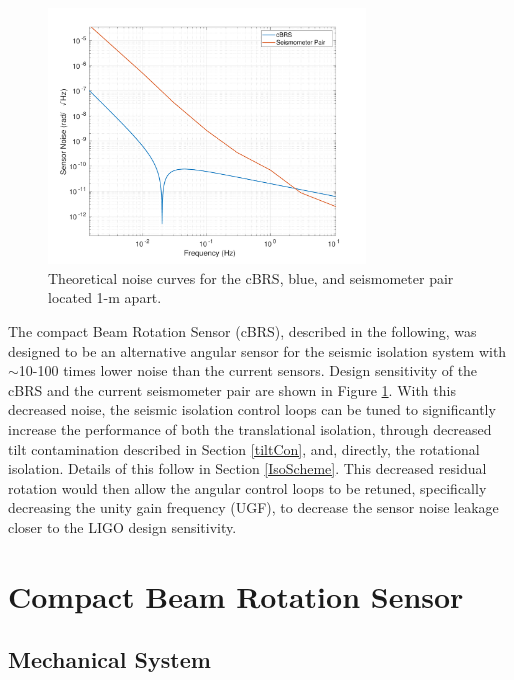 \documentclass [12pt, proquest]{uwthesis}[2019]
\begin{document}
\begin{figure}[!h]
\begin{center}
\includegraphics[width=0.75\textwidth]{sensorNoise.pdf}
\caption[Theoretical noise curves for the cBRS and seismometer pair]{Theoretical noise curves for the cBRS, blue, and seismometer pair located 1-m apart.}
\label{sensNoise}
\end{center}
\end{figure}


The compact Beam Rotation Sensor (cBRS), described in the following, was designed to be an alternative angular sensor for the seismic isolation system with $\sim$10-100 times lower noise than the current sensors. Design sensitivity of the cBRS and the current seismometer pair are shown in Figure \ref{sensNoise}. With this decreased noise, the seismic isolation control loops can be tuned to significantly increase the performance of both the translational isolation, through decreased tilt contamination described in Section \ref{tiltCon}, and, directly, the rotational isolation. Details of this follow in Section \ref{IsoScheme}. This decreased residual rotation would then allow the angular control loops to be retuned, specifically decreasing the unity gain frequency (UGF), to decrease the sensor noise leakage closer to the LIGO design sensitivity.


\section{Compact Beam Rotation Sensor} \label{cBRSSec}
\subsection{Mechanical System}
\end{document}
